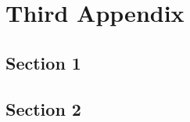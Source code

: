 \chapter{Third Appendix}\label{app:thirdAppendix}
  \section{Section 1}\label{sec:A3section1}
    
  \section{Section 2}\label{sec:A3section2}
    
